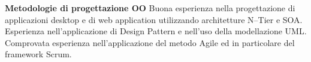 {{}\newline
\textbf{Metodologie di progettazione OO}\newline
\textbullet\hspace{5pt}Buona esperienza nella progettazione di applicazioni desktop e di web application utilizzando architetture N--Tier e SOA.\newline
\textbullet\hspace{5pt}Esperienza nell'applicazione di Design Pattern e nell'uso della modellazione UML.\newline
\textbullet\hspace{5pt}Comprovata esperienza nell'applicazione del metodo Agile ed in particolare del framework Scrum.\newline
}

